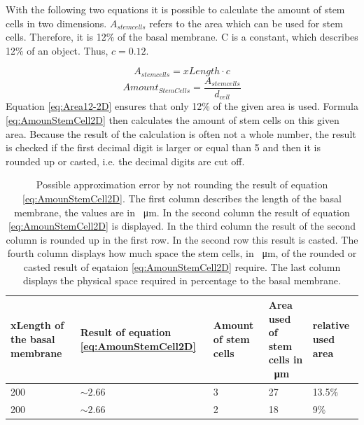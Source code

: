 With the following two equations it is possible to calculate the amount of stem cells in two dimensions. $A_{stem cells}$ refers to the area which can be used for stem cells. Therefore, it is 12\% of the basal membrane. C is a constant, which describes 12\% of an object. Thus, $c=0.12$.

\begin{equation}\label{eq:Area12-2D}
A_{stem cells} = xLength \cdot c
\end{equation}
\begin{equation}\label{eq:AmounStemCell2D}
Amount_{StemCells} = \dfrac{A_{stem cells}}{d_{cell}} 
\end{equation}
Equation \ref{eq:Area12-2D} ensures that only 12\% of the given area is used. Formula \ref{eq:AmounStemCell2D} then calculates the amount of stem cells on this given area. Because the result of the calculation is often not a whole number, the result is checked if the first decimal digit is larger or equal than 5 and then it is rounded up or casted, i.e. the decimal digits are cut off.

\begin{table}
\centering
\caption{Possible approximation error by not rounding the result of equation \ref{eq:AmounStemCell2D}. The first column describes the length of the basal membrane, the values are  in \SI{}{\micro\metre}. In the second column the result of equation \ref{eq:AmounStemCell2D} is displayed. In the third column the result of the second column is rounded up in the first row. In the second row this result is casted. The fourth column displays how much space the stem cells, in \SI{}{\micro\metre}, of the rounded or casted result of eqataion \ref{eq:AmounStemCell2D} require. The last column displays the physical space required in percentage to the basal membrane.}
\renewcommand{\arraystretch}{1.5}
	\begin{tabularx}{\textwidth}{X||X||X||X||X}
		xLength of the basal membrane & Result of equation \ref{eq:AmounStemCell2D} & Amount of stem cells & Area used of stem cells  in \SI{}{\micro\metre} & relative used area  \\
		\hline
		200 & $\sim 2.66$ & 3 & 27 & 13.5\% \\
		
		200 & $\sim 2.66$ & 2 & 18 & 9\% 

	\end{tabularx}
	\label{tbl:Approximation error}
\end{table}

